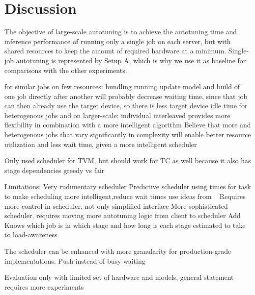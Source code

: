 \section{Discussion}
The objective of large-scale autotuning is to achieve the autotuning time and inference performance of running only a single job on each server, but with shared resources to keep the amount of required hardware at a minimum. Single-job autotuning is represented by Setup A, which is why we use it as baseline for comparisons with the other experiments.

for similar jobs on few resources: bundling
running update model and build of one job directly after another will probably decrease waiting time, since that job can then already use the target device, so there is less target device idle time
for heterogenous jobs and on larger-scale: individual interleaved provides more flexibility in combination with a more intelligent algorithm
Believe that more and heterogenous jobs that vary significantly in complexity will enable better resource utilization and less wait time, given a more intelligent scheduler

Only used scheduler for TVM, but should work for TC as well because it also has stage dependencies
greedy vs fair

Limitations:
Very rudimentary scheduler
Predictive scheduler using times for task to make scheduling more intelligent,reduce wait times
use ideas from ~\cite{Ma.2005}
Requires more control in scheduler, not only simplified interface
More sophisticated scheduler, requires moving more autotuning logic from client to scheduler
Add Knows which job is in which stage and how long is each stage estimated to take to load-awareness

The scheduler can be enhanced with more granularity for production-grade implementations.
Push instead of busy waiting

Evaluation only with limited set of hardware and models, general statement requires more experiments